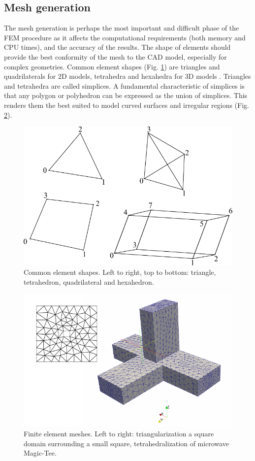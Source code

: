 \subsection{Mesh generation}

The mesh generation is perhaps the most important and difficult phase of the FEM procedure as it affects the computational requirements (both memory and CPU times), and the accuracy of the results. The shape of elements should provide the best conformity of the mesh to the CAD model, especially for complex geometries. Common element shapes (Fig. \ref{fig:Elements}) are triangles and quadrilaterals for 2D models, tetrahedra and hexahedra for 3D models \cite{cubit}. Triangles and tetrahedra are called simplices. A fundamental characteristic of simplices is that any polygon or polyhedron can be expressed as the union of simplices. This renders them the best suited to model curved surfaces and irregular regions (Fig. \ref{fig:Mesh}).

\begin{figure}[h!]
\centering
\includegraphics[width=12cm]{Elements}
\caption{Common element shapes. Left to right, top to bottom: triangle, tetrahedron, quadrilateral and hexahedron.}
\label{fig:Elements}
\end{figure}

\begin{figure}[h!]
\centering
\includegraphics[width=14cm]{Mesh}
\caption{Finite element meshes. Left to right: triangularization a square domain surrounding a small square, tetrahedralization of microwave Magic-Tee.}
\label{fig:Mesh}
\end{figure}

